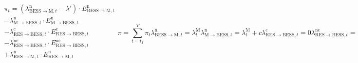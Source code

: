 \begin{subequations}%
  \label{eq:beneficio}

  \begin{equation}
    \begin{split}
      \pi_{t}
      = (\lambda^{\mathrm{n}}_{\mathrm{BESS} \rightarrow \mathrm{M}, t} - \lambda')
      \cdot E^{\mathrm{n}}_{\mathrm{BESS} \rightarrow \mathrm{M}, t}\\
      - \lambda^{\mathrm{n}}_{\mathrm{M} \rightarrow \mathrm{BESS}, t}
      \cdot E^{\mathrm{n}}_{\mathrm{M} \rightarrow \mathrm{BESS}, t}\\
      - \lambda^{\mathrm{c}}_{\mathrm{RES} \rightarrow \mathrm{BESS}, t}
      \cdot E^{\mathrm{c}}_{\mathrm{RES} \rightarrow \mathrm{BESS}, t}\\
      - \lambda^{\mathrm{nc}}_{\mathrm{RES} \rightarrow \mathrm{BESS}, t}
      \cdot E^{\mathrm{nc}}_{\mathrm{RES} \rightarrow \mathrm{BESS}, t}\\
      + \lambda^{\mathrm{n}}_{\mathrm{RES} \rightarrow \mathrm{M}, t}
      \cdot E^{\mathrm{n}}_{\mathrm{RES} \rightarrow \mathrm{M}, t}\\
    \end{split}
  \end{equation}

  \begin{equation}
    \pi = \sum_{t = t_{1}}^{T} \pi_{t}
  \end{equation}

  \begin{equation}
    \lambda^{\mathrm{n}}_{\mathrm{BESS} \rightarrow \mathrm{M}, t} = \lambda^{\mathrm{M}}_{t}
  \end{equation}

  \begin{equation}
    \lambda^{\mathrm{n}}_{\mathrm{M} \rightarrow \mathrm{BESS}, t} = \lambda^{\mathrm{M}}_{t} + c
  \end{equation}

  \begin{equation}
    \lambda^{\mathrm{c}}_{\mathrm{RES} \rightarrow \mathrm{BESS}, t} = 0
  \end{equation}

  \begin{equation}
    \lambda^{\mathrm{nc}}_{\mathrm{RES} \rightarrow \mathrm{BESS}, t} =
    \begin{cases}
      \lambda^{\mathrm{M}}_{t} & \text{si } \exists \, \gamma \land \lambda^{\mathrm{M}}_{t} \ge \lambda^{\mathrm{O}}_{\mathrm{RES}, t} \\
      0                        & \text{sino}                                                                                            \\
    \end{cases}
  \end{equation}


\end{subequations}
